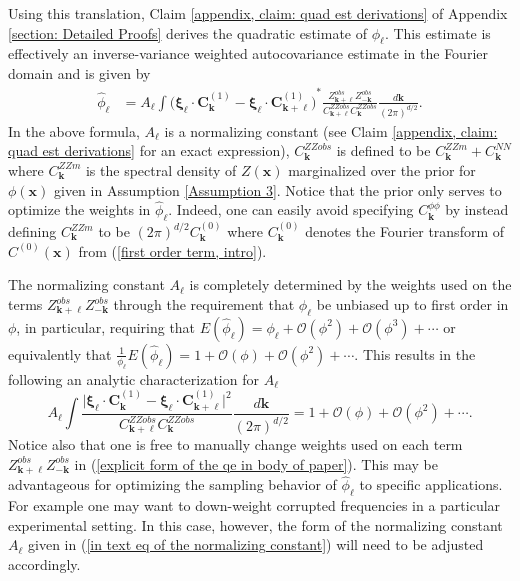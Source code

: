 \documentclass[10pt,noinfoline]{imsart}
\newcommand{\bs}{\boldsymbol}
\begin{document}
Using this translation, Claim \ref{appendix, claim: quad est derivations} of Appendix \ref{section: Detailed Proofs} derives the quadratic estimate of $\phi_{\bs \ell}$. This estimate is effectively  an inverse-variance weighted autocovariance estimate in the Fourier domain and is given by
\begin{align}
    \label{explicit form of the qe in body of paper}
    \hat\phi_{\bs \ell}
    &=  A_{\bs \ell}
        \int
        {\Big(\bs\xi_{\bs \ell} \!\cdot\!\bs C^{{(1)}}_{\bs k} - \bs\xi_{\bs \ell} \!\cdot\!\bs C^{{(1)}}_{\bs k+\bs \ell}\Big)}^{\! *}
        \frac{Z^{obs}_{\bs k+\bs \ell}Z^{obs}_{-\bs k}}{C^{ZZobs}_{\bs k+\bs \ell}C^{ZZobs}_{\bs k}}\frac{d\bs k}{{(2\pi)}^{d/2}}.
\end{align}
In the above formula, $A_{\bs \ell}$ is a normalizing constant (see Claim \ref{appendix, claim: quad est derivations} for an exact expression),  $C^{ZZobs}_{\bs k}$ is defined to be $C^{ZZm}_{\bs k} + C^{N\!N}_{\bs k}$ where $C^{ZZm}_{\bs k}$ is the spectral density of $Z(\bs x)$ marginalized over the prior for $\phi(\bs x)$ given in Assumption \ref{Assumption 3}. Notice that the prior only serves to optimize the weights in $\hat\phi_{\bs \ell}$. Indeed, one can easily avoid specifying $C_{\bs k}^{\phi\phi}$ by instead defining $C^{ZZm}_{\bs k}$ to be ${(2\pi)}^{d/2}C^{(0)}_{\bs k}$ where $C^{(0)}_{\bs k}$ denotes the Fourier transform of $C^{(0)}(\bs x)$ from (\ref{first order term, intro}).

The normalizing constant $A_{\bs \ell}$ is completely determined by the weights used on the terms $Z^{obs}_{\bs k+\bs \ell}Z^{obs}_{-\bs k}$ through the requirement that $\hat\phi_{\bs \ell}$ be unbiased up to first order in $\phi$, in particular, requiring that $E(\hat\phi_{\bs \ell}) = \phi_{\bs \ell} + \mathcal O(\phi^2)+ \mathcal O(\phi^3)+\cdots$ or equivalently that $\frac{1}{\phi_{\bs \ell}}E(\hat\phi_{\bs \ell}) = 1 + \mathcal O(\phi)+ \mathcal O(\phi^2)+\cdots$. 
This results in the following an analytic characterization for $A_{\bs \ell}$
\begin{equation}
\label{in text eq of the normalizing constant}
 A_{\bs \ell}
        \int
        \frac{\big|{\bs\xi_{\bs\ell}\!\cdot\! \bs C^{(1)}_{\bs k} - \bs\xi_{\bs\ell}\!\cdot\! \bs C_{\bs k+\bs \ell}^{(1)}}\big|^2}{C^{ZZobs}_{\bs k+\bs \ell}C^{ZZobs}_{\bs k}}\frac{d\bs k}{{(2\pi)}^{d/2}} = 1 + \mathcal O(\phi) + \mathcal O(\phi^2) + \cdots.
\end{equation}
Notice also that one is free to manually change weights used on each term $Z^{obs}_{\bs k+\bs \ell}Z^{obs}_{-\bs k}$ in  (\ref{explicit form of the qe in body of paper}). This may be advantageous for optimizing the sampling behavior of $\hat\phi_{\bs \ell}$ to specific applications. For example one may want to down-weight corrupted frequencies in a particular experimental setting. In this case, however, the form of the normalizing constant $A_{\bs \ell}$ given in (\ref{in text eq of the normalizing constant}) will need to be adjusted accordingly.
\end{document}
